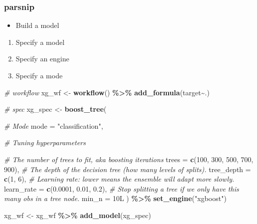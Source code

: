 \documentclass[
]{book}
\newenvironment{Shaded}{\begin{snugshade}}{\end{snugshade}}
\newcommand{\CommentTok}[1]{\textcolor[rgb]{0.56,0.35,0.01}{\textit{#1}}}
\newcommand{\DataTypeTok}[1]{\textcolor[rgb]{0.13,0.29,0.53}{#1}}
\newcommand{\DecValTok}[1]{\textcolor[rgb]{0.00,0.00,0.81}{#1}}
\newcommand{\FloatTok}[1]{\textcolor[rgb]{0.00,0.00,0.81}{#1}}
\newcommand{\KeywordTok}[1]{\textcolor[rgb]{0.13,0.29,0.53}{\textbf{#1}}}
\newcommand{\NormalTok}[1]{#1}
\newcommand{\OperatorTok}[1]{\textcolor[rgb]{0.81,0.36,0.00}{\textbf{#1}}}
\newcommand{\StringTok}[1]{\textcolor[rgb]{0.31,0.60,0.02}{#1}}
\providecommand{\tightlist}{%
  \setlength{\itemsep}{0pt}\setlength{\parskip}{0pt}}
\begin{document}
\hypertarget{parsnip-3}{%
\subsubsection{parsnip}\label{parsnip-3}}

\begin{itemize}
\tightlist
\item
  Build a model
\end{itemize}

\begin{enumerate}
\def\labelenumi{\arabic{enumi}.}
\tightlist
\item
  Specify a model
\item
  Specify an engine
\item
  Specify a mode
\end{enumerate}

\begin{Shaded}
\begin{Highlighting}[]
\CommentTok{\# workflow }
\NormalTok{xg\_wf \textless{}{-}}\StringTok{ }\KeywordTok{workflow}\NormalTok{() }\OperatorTok{\%\textgreater{}\%}\StringTok{ }\KeywordTok{add\_formula}\NormalTok{(target}\OperatorTok{\textasciitilde{}}\NormalTok{.)}

\CommentTok{\# spec }
\NormalTok{xg\_spec \textless{}{-}}\StringTok{ }\KeywordTok{boost\_tree}\NormalTok{(}
  
           \CommentTok{\# Mode }
           \DataTypeTok{mode =} \StringTok{"classification"}\NormalTok{,}
           
           \CommentTok{\# Tuning hyperparameters}
           
           \CommentTok{\# The number of trees to fit, aka boosting iterations}
           \DataTypeTok{trees =} \KeywordTok{c}\NormalTok{(}\DecValTok{100}\NormalTok{, }\DecValTok{300}\NormalTok{, }\DecValTok{500}\NormalTok{, }\DecValTok{700}\NormalTok{, }\DecValTok{900}\NormalTok{),}
           \CommentTok{\# The depth of the decision tree (how many levels of splits).}
             \DataTypeTok{tree\_depth =} \KeywordTok{c}\NormalTok{(}\DecValTok{1}\NormalTok{, }\DecValTok{6}\NormalTok{), }
           \CommentTok{\# Learning rate: lower means the ensemble will adapt more slowly.}
           \DataTypeTok{learn\_rate =} \KeywordTok{c}\NormalTok{(}\FloatTok{0.0001}\NormalTok{, }\FloatTok{0.01}\NormalTok{, }\FloatTok{0.2}\NormalTok{),}
           \CommentTok{\# Stop splitting a tree if we only have this many obs in a tree node.}
             \DataTypeTok{min\_n =}\NormalTok{ 10L}
\NormalTok{          ) }\OperatorTok{\%\textgreater{}\%}\StringTok{ }
\StringTok{  }\KeywordTok{set\_engine}\NormalTok{(}\StringTok{"xgboost"}\NormalTok{) }

\NormalTok{xg\_wf \textless{}{-}}\StringTok{ }\NormalTok{xg\_wf }\OperatorTok{\%\textgreater{}\%}\StringTok{ }\KeywordTok{add\_model}\NormalTok{(xg\_spec)}
\end{Highlighting}
\end{Shaded}
\end{document}
